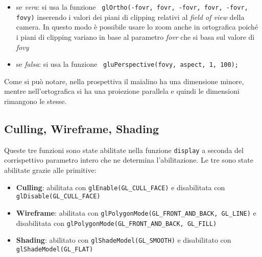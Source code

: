\begin{itemize}
  \item se \textit{vera}: si usa la funzione \texttt{
		glOrtho(-fovr, fovr, -fovr, fovr, -fovr, fovy)} inserendo i valori dei piani di clipping relativi al \textit{field of view} della camera. In questo modo è possibile usare lo zoom anche in ortografica poiché i piani di clipping variano in base al parametro \textit{fovr} che si basa sul valore di \textit{fovy}
  \item se \textit{falsa}: si usa la funzione \texttt{
		gluPerspective(fovy, aspect, 1, 100);}
\end{itemize}
\begin{figure}[hbt]%
	\vspace{-1cm}
    \centering
	\vspace{-0.2cm}
\end{figure}

Come si può notare, nella prospettiva il maialino ha una dimensione minore, mentre nell'ortografica si ha una proiezione parallela e quindi le dimensioni rimangono le stesse.

\subsection{Culling, Wireframe, Shading}
Queste tre funzioni sono state abilitate nella funzione \texttt{display} a seconda del corrispettivo parametro intero che ne determina l'abilitazione. Le tre sono state abilitate grazie alle primitive: 
\begin{itemize}
  \item \textbf{Culling}: abilitata con \texttt{glEnable\-(GL\_CULL\_FACE)} e disabilitata con \texttt{glDisable\-(GL\_CULL\_FACE)}
  \item \textbf{Wireframe}: abilitata con \texttt{glPolygon\-Mode\-(GL\_FRONT\_AND\_BACK, GL\_LINE)} e disabilitata con \texttt{glPolygon\-Mode\-(GL\_FRONT\_AND\_BACK, GL\_FILL)}
  \item \textbf{Shading}: abilitato con \texttt{glShadeModel\-(GL\_SMOOTH)} e disabilitato con \texttt{glShadeModel\-(GL\_FLAT)}
\end{itemize}

\begin{figure}[hbt]%
	\vspace{-1cm}
    \centering
	\vspace{-0.2cm}
\end{figure}

